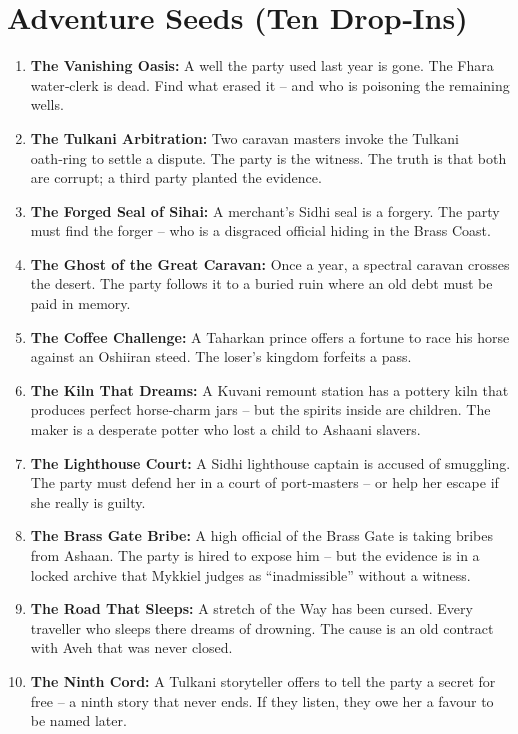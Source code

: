 \documentclass[11pt]{book}
\begin{document}
\section{Adventure Seeds (Ten Drop‑Ins)}
\begin{enumerate}
    \item \textbf{The Vanishing Oasis:} A well the party used last year is gone. The Fhara water‑clerk is dead. Find what erased it – and who is poisoning the remaining wells.
    \item \textbf{The Tulkani Arbitration:} Two caravan masters invoke the Tulkani oath‑ring to settle a dispute. The party is the witness. The truth is that both are corrupt; a third party planted the evidence.
    \item \textbf{The Forged Seal of Sihai:} A merchant’s Sidhi seal is a forgery. The party must find the forger – who is a disgraced official hiding in the Brass Coast.
    \item \textbf{The Ghost of the Great Caravan:} Once a year, a spectral caravan crosses the desert. The party follows it to a buried ruin where an old debt must be paid in memory.
    \item \textbf{The Coffee Challenge:} A Taharkan prince offers a fortune to race his horse against an Oshiiran steed. The loser’s kingdom forfeits a pass.
    \item \textbf{The Kiln That Dreams:} A Kuvani remount station has a pottery kiln that produces perfect horse‑charm jars – but the spirits inside are children. The maker is a desperate potter who lost a child to Ashaani slavers.
    \item \textbf{The Lighthouse Court:} A Sidhi lighthouse captain is accused of smuggling. The party must defend her in a court of port‑masters – or help her escape if she really is guilty.
    \item \textbf{The Brass Gate Bribe:} A high official of the Brass Gate is taking bribes from Ashaan. The party is hired to expose him – but the evidence is in a locked archive that Mykkiel judges as “inadmissible” without a witness.
    \item \textbf{The Road That Sleeps:} A stretch of the Way has been cursed. Every traveller who sleeps there dreams of drowning. The cause is an old contract with Aveh that was never closed.
    \item \textbf{The Ninth Cord:} A Tulkani storyteller offers to tell the party a secret for free – a ninth story that never ends. If they listen, they owe her a favour to be named later.
\end{enumerate}
\end{document}
